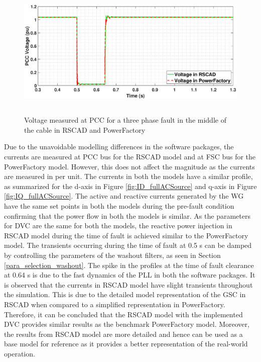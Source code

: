 \begin{figure}[H]
    \includegraphics[height = 6.5cm,width = \textwidth]{Diagrams/Chapter_3/VACP_Comp_New_4.eps}
    \caption{Voltage measured at PCC for a three phase fault in the middle of the cable in RSCAD and PowerFactory}
    \label{fig:VACP_comp}
\end{figure}

Due to the unavoidable modelling differences in the software packages, the currents are measured at \gls{PCC} bus for the RSCAD model and at \gls{FSC} bus for the PowerFactory model. However, this does not affect the magnitude as the currents are measured in per unit. The currents in both the models have a similar profile, as summarized for the d-axis in Figure \ref{fig:ID_fullACSource} and q-axis in Figure \ref{fig:IQ_fullACSource}. The active and reactive currents generated by the \gls{WG} have the same set points in both the models during the pre-fault condition confirming that the power flow in both the models is similar. As the parameters for \gls{DVC} are the same for both the models, the reactive power injection in RSCAD model during the time of fault is achieved similar to the PowerFactory model. The transients occurring during the time of fault at 0.5 s can be damped by controlling the parameters of the washout filters, as seen in Section \ref{para_selection_washout}. The spike in the profiles at the time of fault clearance at 0.64 s is due to the fast dynamics of the \gls{PLL} in both the software packages. It is observed that the currents in RSCAD model have slight transients throughout the simulation. This is due to the detailed model representation of the \gls{GSC} in RSCAD when compared to a simplified representation in PowerFactory. Therefore, it can be concluded that the RSCAD model with the implemented \gls{DVC} provides similar results as the benchmark PowerFactory model. Moreover, the results from RSCAD model are more detailed and hence can be used as a base model for reference as it provides a better representation of the real-world operation.  


